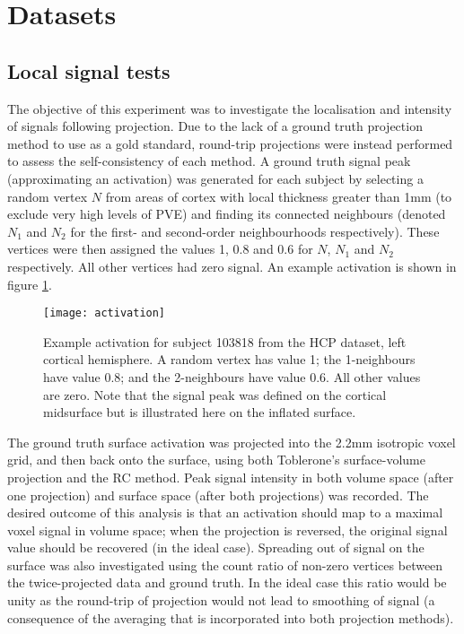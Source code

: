 \section{Datasets}
\subsection{Local signal tests}
The objective of this experiment was to investigate the localisation and intensity of signals following projection. Due to the lack of a ground truth projection method to use as a gold standard, round-trip projections were instead performed to assess the self-consistency of each method. A ground truth signal peak (approximating an activation) was generated for each subject by selecting a random vertex $N$ from areas of cortex with local thickness greater than 1mm (to exclude very high levels of PVE) and finding its connected neighbours (denoted $N_1$ and $N_2$ for the first- and second-order neighbourhoods respectively). These vertices were then assigned the values 1, 0.8 and 0.6 for $N$, $N_1$ and $N_2$ respectively. All other vertices had zero signal. An example activation is shown in figure \ref{activation_example}. 

\begin{figure}
\centering
\texttt{[image: activation]}
\caption{Example activation for subject 103818 from the HCP dataset, left cortical hemisphere. A random vertex has value 1; the 1-neighbours have value 0.8; and the 2-neighbours have value 0.6. All other values are zero. Note that the signal peak was defined on the cortical midsurface but is illustrated here on the inflated surface.}
\label{activation_example} 
\end{figure}

The ground truth surface activation was projected into the 2.2mm isotropic voxel grid, and then back onto the surface, using both Toblerone's surface-volume projection and the RC method. Peak signal intensity in both volume space (after one projection) and surface space (after both projections) was recorded. The desired outcome of this analysis is that an activation should map to a maximal voxel signal in volume space; when the projection is reversed, the original signal value should be recovered (in the ideal case). Spreading out of signal on the surface was also investigated using the count ratio of non-zero vertices between the twice-projected data and ground truth. In the ideal case this ratio would be unity as the round-trip of projection would not lead to smoothing of signal (a consequence of the averaging that is incorporated into both projection methods). 

